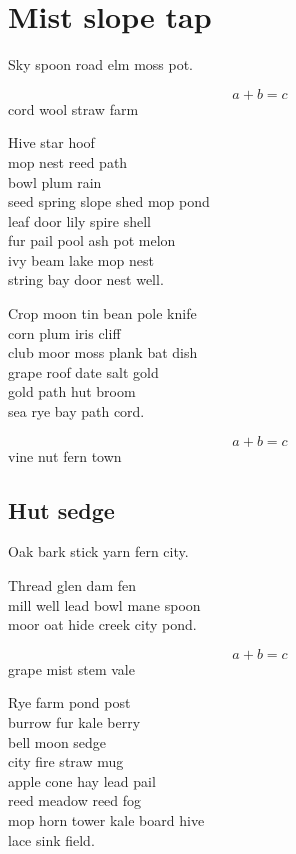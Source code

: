 \documentclass{memoir}
\begin{document}
\chapter{Mist slope tap}

Sky spoon road elm moss pot.

\begin{equation}
  a + b = c
\end{equation}
cord wool straw farm

Hive star hoof \\
mop nest reed path \\
bowl plum rain \\
seed spring slope shed mop pond \\
leaf door lily spire shell \\
fur pail pool ash pot melon \\
ivy beam lake mop nest \\
string bay door nest well.

Crop moon tin bean pole knife \\
corn plum iris cliff \\
club moor moss plank bat dish \\
grape roof date salt gold \\
gold path hut broom \\
sea rye bay path cord.

\begin{equation}
  a + b = c
\end{equation}
vine nut fern town

\section{Hut sedge}

Oak bark stick yarn fern city.

Thread glen dam fen \\
mill well lead bowl mane spoon \\
moor oat hide creek city pond.

\begin{equation}
  a + b = c
\end{equation}
grape mist stem vale

Rye farm pond post \\
burrow fur kale berry \\
bell moon sedge \\
city fire straw mug \\
apple cone hay lead pail \\
reed meadow reed fog \\
mop horn tower kale board hive \\
lace sink field.
\end{document}
